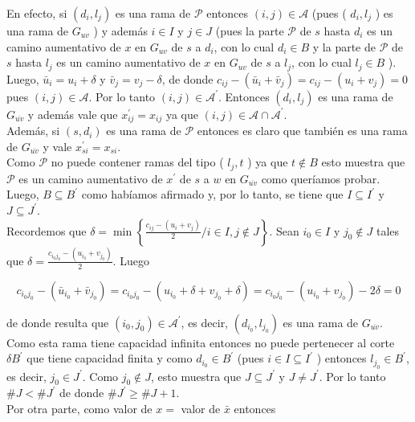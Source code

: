 \documentclass[10pt]{article}
\begin{document}
En efecto, si $\left(d_{i}, l_{j}\right)$ es una rama de $\mathcal{P}$ entonces $(i, j) \in \mathcal{A}$ (pues ( $d_{i}, l_{j}$ ) es una rama de $G_{u v}$ ) y además $i \in I$ y $j \in J$ (pues la parte $\mathcal{P}$ de $s$ hasta $d_{i}$ es un camino aumentativo de $x$ en $G_{u v}$ de $s$ a $d_{i}$, con lo cual $d_{i} \in B$ y la parte de $\mathcal{P}$ de $s$ hasta $l_{j}$ es un camino aumentativo de $x$ en $G_{u v}$ de $s$ a $l_{j}$, con lo cual $l_{j} \in B$ ). Luego, $\bar{u}_{i}=u_{i}+\delta$ y $\bar{v}_{j}=v_{j}-\delta$, de donde $c_{i j}-\left(\bar{u}_{i}+\bar{v}_{j}\right)=c_{i j}-\left(u_{i}+v_{j}\right)=0$ pues $(i, j) \in \mathcal{A}$. Por lo tanto $(i, j) \in \mathcal{A}^{\prime}$. Entonces $\left(d_{i}, l_{j}\right)$ es una rama de $G_{\overline{u v}}$ y además vale que $x_{i j}^{\prime}=x_{i j}$ ya que $(i, j) \in \mathcal{A} \cap \mathcal{A}^{\prime}$.\\
Además, si $\left(s, d_{i}\right)$ es una rama de $\mathcal{P}$ entonces es claro que también es una rama de $G_{\overline{u v}}$ y vale $x_{s i}^{\prime}=x_{s i}$.\\
Como $\mathcal{P}$ no puede contener ramas del tipo ( $l_{j}, t$ ) ya que $t \notin B$ esto muestra que $\mathcal{P}$ es un camino aumentativo de $x^{\prime}$ de $s$ a $w$ en $G_{\overline{u v}}$ como queríamos probar.\\
Luego, $B \subseteq B^{\prime}$ como habíamos afirmado y, por lo tanto, se tiene que $I \subseteq I^{\prime}$ y $J \subseteq J^{\prime}$.\\
Recordemos que $\delta=\min \left\{\frac{c_{i j}-\left(u_{i}+v_{j}\right)}{2} / i \in I, j \notin J\right\}$. Sean $i_{0} \in I$ y $j_{0} \notin J$ tales que $\delta=\frac{c_{i_{0} j_{0}}-\left(u_{i_{0}}+v_{j_{0}}\right)}{2}$. Luego

$$
c_{i_{0} j_{0}}-\left(\bar{u}_{i_{0}}+\bar{v}_{j_{0}}\right)=c_{i_{0} j_{0}}-\left(u_{i_{0}}+\delta+v_{j_{0}}+\delta\right)=c_{i_{0} j_{0}}-\left(u_{i_{0}}+v_{j_{0}}\right)-2 \delta=0
$$

de donde resulta que $\left(i_{0}, j_{0}\right) \in \mathcal{A}^{\prime}$, es decir, $\left(d_{i_{0}}, l_{j_{0}}\right)$ es una rama de $G_{\overline{u v}}$. Como esta rama tiene capacidad infinita entonces no puede pertenecer al corte $\delta B^{\prime}$ que tiene capacidad finita y como $d_{i_{0}} \in B^{\prime}$ (pues $i \in I \subseteq I^{\prime}$ ) entonces $l_{j_{0}} \in B^{\prime}$, es decir, $j_{0} \in J^{\prime}$. Como $j_{0} \notin J$, esto muestra que $J \subseteq J^{\prime}$ y $J \neq J^{\prime}$. Por lo tanto $\# J<\# J^{\prime}$ de donde $\# J^{\prime} \geq \# J+1$.\\
Por otra parte, como valor de $x=$ valor de $\bar{x}$ entonces
\end{document}

